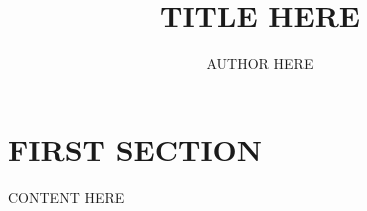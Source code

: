 \documentclass[letter,12pt]{article}
\begin{document}
\title{TITLE HERE}
\author{AUTHOR HERE}

\maketitle
\newpage
{}


\section{FIRST SECTION}

CONTENT HERE
\end{document}
